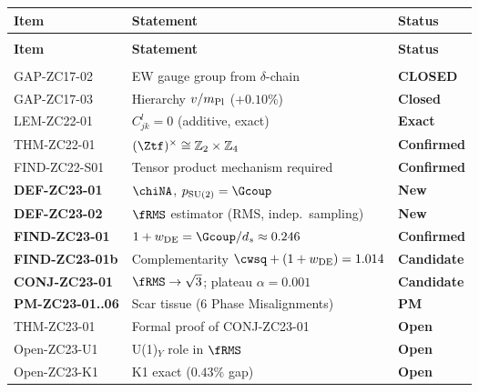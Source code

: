 \documentclass[12pt, a4paper]{article}
\begin{document}
\begin{formalbox}[title={Z-Programme Status after TASK-ZC23}]
{\small
\setlength{\LTpre}{4pt}\setlength{\LTpost}{4pt}
\renewcommand{\arraystretch}{1.30}
\begin{longtable}{>{\raggedright\arraybackslash}p{3.4cm}
                  >{\raggedright\arraybackslash}p{5.6cm}
                  >{\centering\arraybackslash}p{2.4cm}}
\toprule
\textbf{Item} & \textbf{Statement} & \textbf{Status} \\
\midrule
\endfirsthead
\multicolumn{3}{l}{\small\textit{(continued)}}\\[4pt]
\toprule
\textbf{Item} & \textbf{Statement} & \textbf{Status} \\
\midrule
\endhead
\midrule
\multicolumn{3}{r}{\small\textit{(continues)}}\\
\endfoot
\bottomrule
\endlastfoot
GAP-ZC17-02   & EW gauge group from $\delta$-chain  & \textbf{CLOSED}\\
GAP-ZC17-03   & Hierarchy $v/m_{\rm Pl}$ ($+0.10\%$) & \textbf{Closed}\\
\midrule
LEM-ZC22-01   & $C^l_{jk}=0$ (additive, exact) & \textbf{Exact}\\
THM-ZC22-01   & $(\Ztf)^\times\cong\mathbb{Z}_2\times\mathbb{Z}_4$ & \textbf{Confirmed}\\
FIND-ZC22-S01 & Tensor product mechanism required & \textbf{Confirmed}\\
\midrule
\textbf{DEF-ZC23-01} & $\chiNA$, $p_{\rm SU(2)}=\Gcoup$ & \textbf{New}\\
\textbf{DEF-ZC23-02} & $\fRMS$ estimator (RMS, indep.\ sampling) & \textbf{New}\\
\textbf{FIND-ZC23-01} & $1+w_{\rm DE}=\Gcoup/d_s\approx 0.246$ & \textbf{Confirmed}\\
\textbf{FIND-ZC23-01b} & Complementarity $\cwsq+(1+w_{\rm DE})=1.014$ & \textbf{Candidate}\\
\textbf{CONJ-ZC23-01} & $\fRMS\to\sqrt{3}$; plateau $\alpha=0.001$ & \textbf{Candidate}\\
\textbf{PM-ZC23-01..06} & Scar tissue (6 Phase Misalignments) & \textbf{PM}\\
\midrule
THM-ZC23-01   & Formal proof of CONJ-ZC23-01 & \textbf{Open}\\
Open-ZC23-U1  & U(1)$_Y$ role in $\fRMS$ & \textbf{Open}\\
Open-ZC23-K1  & K1 exact ($0.43\%$ gap) & \textbf{Open}\\
\end{longtable}
}
\end{formalbox}
\end{document}
